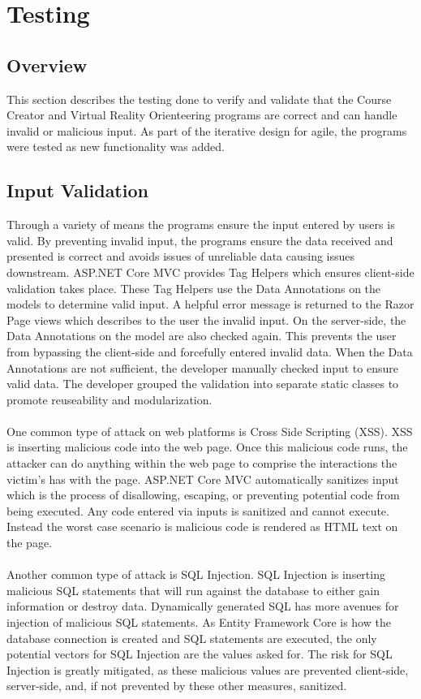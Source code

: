 \section{Testing}																	
\label{sec:Testing}

\subsection{Overview} 
This section describes the testing done to verify and validate that the Course Creator and Virtual Reality Orienteering programs are correct and can handle invalid or malicious input. As part of the iterative design for agile, the programs were tested as new functionality was added. 

\subsection{Input Validation}
Through a variety of means the programs ensure the input entered by users is valid. By preventing invalid input, the programs ensure the data received and presented is correct and avoids issues of unreliable data causing issues downstream. ASP.NET Core MVC provides Tag Helpers which ensures client-side validation takes place. These Tag Helpers use the Data Annotations on the models to determine valid input. A helpful error message is returned to the Razor Page views which describes to the user the invalid input. On the server-side, the Data Annotations on the model are also checked again. This prevents the user from bypassing the client-side and forcefully entered invalid data. When the Data Annotations are not sufficient, the developer manually checked input to ensure valid data. The developer grouped the validation into separate static classes to promote reuseability and modularization. \\
\\
One common type of attack on web platforms is Cross Side Scripting (XSS). XSS is inserting malicious code into the web page. Once this malicious code runs, the attacker can do anything within the web page to comprise the interactions the victim's has with the page. ASP.NET Core MVC automatically sanitizes input which is the process of disallowing, escaping, or preventing potential code from being executed. Any code entered via inputs is sanitized and cannot execute. Instead the worst case scenario is malicious code is rendered as HTML text on the page.\\
\\
Another common type of attack is SQL Injection. SQL Injection is inserting malicious SQL statements that will run against the database to either gain information or destroy data. Dynamically generated SQL has more avenues for injection of malicious SQL statements. As Entity Framework Core is how the database connection is created and SQL statements are executed, the only potential vectors for SQL Injection are the values asked for. The risk for SQL Injection is greatly mitigated, as these malicious values are prevented client-side, server-side, and, if not prevented by these other measures, sanitized. 
